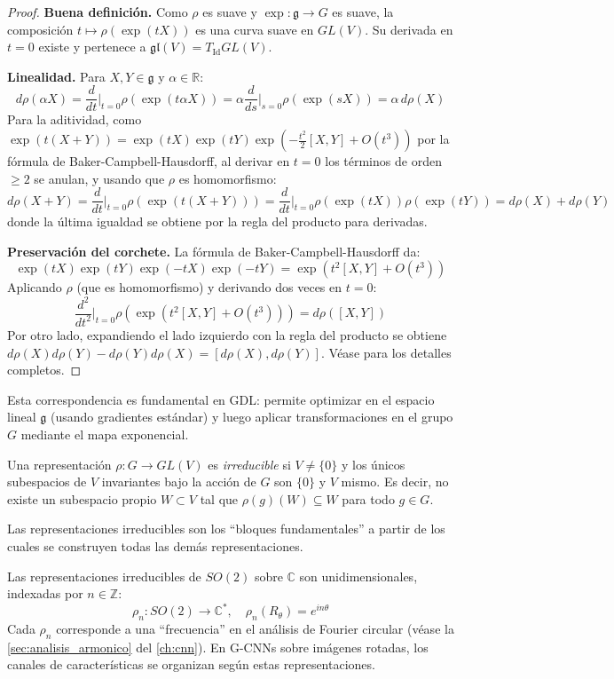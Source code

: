 \begin{proof}
\textbf{Buena definición.} Como $\rho$ es suave y $\exp: \mathfrak{g} \to G$ es suave, la composición $t \mapsto \rho(\exp(tX))$ es una curva suave en $GL(V)$. Su derivada en $t=0$ existe y pertenece a $\mathfrak{gl}(V) = T_{\text{Id}} GL(V)$.

\textbf{Linealidad.} Para $X, Y \in \mathfrak{g}$ y $\alpha \in \mathbb{R}$:
\[
d\rho(\alpha X) = \frac{d}{dt}\Big|_{t=0} \rho(\exp(t\alpha X)) = \alpha \frac{d}{ds}\Big|_{s=0} \rho(\exp(sX)) = \alpha\, d\rho(X)
\]
Para la aditividad, como $\exp(t(X+Y)) = \exp(tX)\exp(tY)\exp(-\tfrac{t^2}{2}[X,Y] + O(t^3))$ por la fórmula de Baker-Campbell-Hausdorff, al derivar en $t=0$ los términos de orden $\geq 2$ se anulan, y usando que $\rho$ es homomorfismo:
\[
d\rho(X+Y) = \frac{d}{dt}\Big|_{t=0} \rho(\exp(t(X+Y))) = \frac{d}{dt}\Big|_{t=0} \rho(\exp(tX))\rho(\exp(tY)) = d\rho(X) + d\rho(Y)
\]
donde la última igualdad se obtiene por la regla del producto para derivadas.

\textbf{Preservación del corchete.} La fórmula de Baker-Campbell-Hausdorff da:
\[
\exp(tX)\exp(tY)\exp(-tX)\exp(-tY) = \exp(t^2[X,Y] + O(t^3))
\]
Aplicando $\rho$ (que es homomorfismo) y derivando dos veces en $t=0$:
\[
\frac{d^2}{dt^2}\Big|_{t=0} \rho(\exp(t^2[X,Y] + O(t^3))) = d\rho([X,Y])
\]
Por otro lado, expandiendo el lado izquierdo con la regla del producto se obtiene $d\rho(X)d\rho(Y) - d\rho(Y)d\rho(X) = [d\rho(X), d\rho(Y)]$. Véase \citep[Theorem~3.28]{Kirillov2008} para los detalles completos.
\end{proof}

Esta correspondencia es fundamental en \gls{GDL}: permite optimizar en el espacio lineal $\mathfrak{g}$ (usando gradientes estándar) y luego aplicar transformaciones en el grupo $G$ mediante el mapa exponencial.

\begin{definition}\label{def:representacion_irreducible}
Una representación $\rho: G \rightarrow GL(V)$ es \textit{irreducible} si $V \neq \{0\}$ y los únicos subespacios de $V$ invariantes bajo la acción de $G$ son $\{0\}$ y $V$ mismo. Es decir, no existe un subespacio propio $W \subset V$ tal que $\rho(g)(W) \subseteq W$ para todo $g \in G$.
\end{definition}

Las representaciones irreducibles son los ``bloques fundamentales'' a partir de los cuales se construyen todas las demás representaciones.

\begin{example}\label{ex:irreps_so2}
Las representaciones irreducibles de $SO(2)$ sobre $\mathbb{C}$ son unidimensionales, indexadas por $n \in \mathbb{Z}$:
\begin{equation}
\rho_n: SO(2) \rightarrow \mathbb{C}^*, \quad \rho_n(R_\theta) = e^{in\theta}
\end{equation}
Cada $\rho_n$ corresponde a una ``frecuencia'' en el análisis de Fourier circular (véase la \autoref{sec:analisis_armonico} del \autoref{ch:cnn}). En G-CNNs sobre imágenes rotadas, los canales de características se organizan según estas representaciones.
\end{example}

